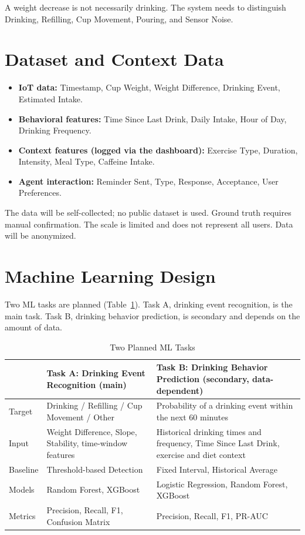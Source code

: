 \documentclass[conference]{IEEEtran}
\begin{document}
A weight decrease is not necessarily drinking. The system needs to distinguish Drinking, Refilling, Cup Movement, Pouring, and Sensor Noise.

\section{Dataset and Context Data}\label{sec:dataset}

\begin{itemize}
\item \textbf{IoT data:} Timestamp, Cup Weight, Weight Difference, Drinking Event, Estimated Intake.
\item \textbf{Behavioral features:} Time Since Last Drink, Daily Intake, Hour of Day, Drinking Frequency.
\item \textbf{Context features (logged via the dashboard):} Exercise Type, Duration, Intensity, Meal Type, Caffeine Intake.
\item \textbf{Agent interaction:} Reminder Sent, Type, Response, Acceptance, User Preferences.
\end{itemize}
The data will be self-collected; no public dataset is used. Ground truth requires manual confirmation. The scale is limited and does not represent all users. Data will be anonymized.

\section{Machine Learning Design}\label{sec:ml}

Two ML tasks are planned (Table~\ref{tab:ml}). Task A, drinking event recognition, is the main task. Task B, drinking behavior prediction, is secondary and depends on the amount of data.

\begin{table}[htbp]
\caption{Two Planned ML Tasks}
\label{tab:ml}
\centering
\footnotesize
\begin{tabular}{@{}p{}p{}p{}@{}}
\toprule
 & \textbf{Task A: Drinking Event Recognition (main)} & \textbf{Task B: Drinking Behavior Prediction (secondary, data-dependent)} \\
\midrule
Target & Drinking / Refilling / Cup Movement / Other & Probability of a drinking event within the next 60 minutes \\
\midrule
Input & Weight Difference, Slope, Stability, time-window features & Historical drinking times and frequency, Time Since Last Drink, exercise and diet context \\
\midrule
Baseline & Threshold-based Detection & Fixed Interval, Historical Average \\
\midrule
Models & Random Forest, XGBoost & Logistic Regression, Random Forest, XGBoost \\
\midrule
Metrics & Precision, Recall, F1, Confusion Matrix & Precision, Recall, F1, PR-AUC \\
\bottomrule
\end{tabular}
\end{table}
\end{document}
